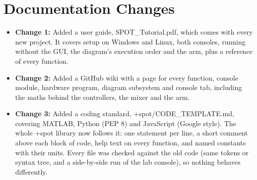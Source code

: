 \documentclass[11pt]{article}
\begin{document}
\section*{\textcolor{primaryColor}{Documentation Changes}}
\begin{itemize}[label={\textcolor{primaryColor}{\textbullet}}]
    \item \textbf{Change 1:} Added a user guide, SPOT\_Tutorial.pdf, which comes with every new project. It covers setup on Windows and Linux, both consoles, running without the GUI, the diagram's execution order and the arm, plus a reference of every function.
    \item \textbf{Change 2:} Added a GitHub wiki with a page for every function, console module, hardware program, diagram subsystem and console tab, including the maths behind the controllers, the mixer and the arm.
    \item \textbf{Change 3:} Added a coding standard, +spot/CODE\_TEMPLATE.md, covering MATLAB, Python (PEP 8) and JavaScript (Google style). The whole +spot library now follows it: one statement per line, a short comment above each block of code, help text on every function, and named constants with their units. Every file was checked against the old code (same tokens or syntax tree, and a side-by-side run of the lab console), so nothing behaves differently.
\end{itemize}

\end{document}
